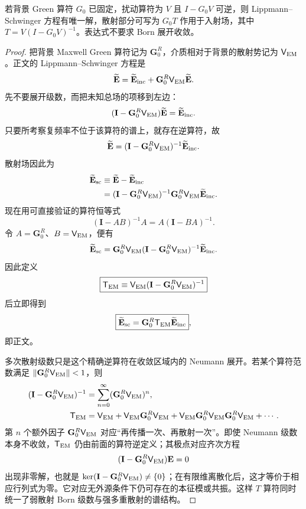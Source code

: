 \begin{proposition}
若背景 Green 算符 $G_0$ 已固定，扰动算符为 $V$ 且 $I-G_0V$ 可逆，则 Lippmann--Schwinger 方程有唯一解，散射部分可写为 $G_0T$ 作用于入射场，其中 $T=V(I-G_0V)^{-1}$。表达式不要求 Born 展开收敛。
\end{proposition}
\begin{proof}
把背景 Maxwell Green 算符记为 $\mathbf G_0^R$，介质相对于背景的散射势记为 $\mathsf V_{\rm EM}$。正文的 Lippmann--Schwinger 方程是
\[
\widetilde{\mathbf E}
=\widetilde{\mathbf E}_{\rm inc}
+\mathbf G_0^R\mathsf V_{\rm EM}\widetilde{\mathbf E}.
\]
先不要展开级数，而把未知总场的项移到左边：
\[
(\mathbf I-\mathbf G_0^R\mathsf V_{\rm EM})\widetilde{\mathbf E}
=\widetilde{\mathbf E}_{\rm inc}.
\]
只要所考察复频率不位于该算符的谱上，就存在逆算符，故
\[
\widetilde{\mathbf E}
=(\mathbf I-\mathbf G_0^R\mathsf V_{\rm EM})^{-1}
\widetilde{\mathbf E}_{\rm inc}.
\]
散射场因此为
\begin{align*}
\widetilde{\mathbf E}_{\rm sc}
&\equiv\widetilde{\mathbf E}-\widetilde{\mathbf E}_{\rm inc}\\
&=(\mathbf I-\mathbf G_0^R\mathsf V_{\rm EM})^{-1}
\mathbf G_0^R\mathsf V_{\rm EM}\widetilde{\mathbf E}_{\rm inc}.
\end{align*}
现在用可直接验证的算符恒等式
\[
(\mathbf I-AB)^{-1}A=A(\mathbf I-BA)^{-1}.
\]
令 $A=\mathbf G_0^R$、$B=\mathsf V_{\rm EM}$，便有
\[
\widetilde{\mathbf E}_{\rm sc}
=\mathbf G_0^R
\mathsf V_{\rm EM}
(\mathbf I-\mathbf G_0^R\mathsf V_{\rm EM})^{-1}
\widetilde{\mathbf E}_{\rm inc}.
\]
因此定义
\[
\boxed{
\mathsf T_{\rm EM}
\equiv\mathsf V_{\rm EM}
(\mathbf I-\mathbf G_0^R\mathsf V_{\rm EM})^{-1}}
\]
后立即得到
\[
\boxed{
\widetilde{\mathbf E}_{\rm sc}
=\mathbf G_0^R\mathsf T_{\rm EM}\widetilde{\mathbf E}_{\rm inc}},
\]
即正文。

多次散射级数只是这个精确逆算符在收敛区域内的 Neumann 展开。若某个算符范数满足 $\lVert\mathbf G_0^R\mathsf V_{\rm EM}\rVert<1$，则
\begin{align*}
(\mathbf I-\mathbf G_0^R\mathsf V_{\rm EM})^{-1}
&=\sum_{n=0}^{\infty}(\mathbf G_0^R\mathsf V_{\rm EM})^n,\\
\mathsf T_{\rm EM}
&=\mathsf V_{\rm EM}
+\mathsf V_{\rm EM}\mathbf G_0^R\mathsf V_{\rm EM}
+\mathsf V_{\rm EM}\mathbf G_0^R\mathsf V_{\rm EM}\mathbf G_0^R\mathsf V_{\rm EM}+\cdots.
\end{align*}
第 $n$ 个额外因子 $\mathbf G_0^R\mathsf V_{\rm EM}$ 对应“再传播一次、再散射一次”。即使 Neumann 级数本身不收敛，$\mathsf T_{\rm EM}$ 仍由前面的算符逆定义；其极点对应齐次方程
\[
(\mathbf I-\mathbf G_0^R\mathsf V_{\rm EM})\mathbf E=0
\]
出现非零解，也就是
$\ker(\mathbf I-\mathbf G_0^R\mathsf V_{\rm EM})\neq\{0\}$；在有限维离散化后，这才等价于相应行列式为零。它对应无外源条件下仍可存在的本征模或共振。这样 $T$ 算符同时统一了弱散射 Born 级数与强多重散射的谱结构。
\end{proof}

